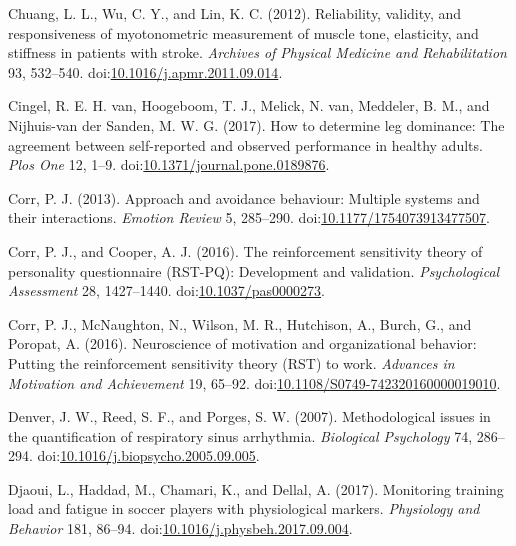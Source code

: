 \documentclass[
]{frontiersHLTH}
\newlength{\cslhangindent}
\newenvironment{cslreferences}%
  {\setlength{\parindent}{0pt}%
  \everypar{\setlength{\hangindent}{\cslhangindent}}\ignorespaces}%
  {\par}
\begin{document}
\begin{cslreferences}
\leavevmode\hypertarget{ref-Chuang2012}{}%
Chuang, L. L., Wu, C. Y., and Lin, K. C. (2012). Reliability, validity,
and responsiveness of myotonometric measurement of muscle tone,
elasticity, and stiffness in patients with stroke. \emph{Archives of
Physical Medicine and Rehabilitation} 93, 532--540.
doi:\href{https://doi.org/10.1016/j.apmr.2011.09.014}{10.1016/j.apmr.2011.09.014}.

\leavevmode\hypertarget{ref-VanCingel2017}{}%
Cingel, R. E. H. van, Hoogeboom, T. J., Melick, N. van, Meddeler, B. M.,
and Nijhuis-van der Sanden, M. W. G. (2017). How to determine leg
dominance: The agreement between self-reported and observed performance
in healthy adults. \emph{Plos One} 12, 1--9.
doi:\href{https://doi.org/10.1371/journal.pone.0189876}{10.1371/journal.pone.0189876}.

\leavevmode\hypertarget{ref-Corr2013}{}%
Corr, P. J. (2013). Approach and avoidance behaviour: Multiple systems
and their interactions. \emph{Emotion Review} 5, 285--290.
doi:\href{https://doi.org/10.1177/1754073913477507}{10.1177/1754073913477507}.

\leavevmode\hypertarget{ref-Corr2016c}{}%
Corr, P. J., and Cooper, A. J. (2016). The reinforcement sensitivity
theory of personality questionnaire (RST-PQ): Development and
validation. \emph{Psychological Assessment} 28, 1427--1440.
doi:\href{https://doi.org/10.1037/pas0000273}{10.1037/pas0000273}.

\leavevmode\hypertarget{ref-Corr2016b}{}%
Corr, P. J., McNaughton, N., Wilson, M. R., Hutchison, A., Burch, G.,
and Poropat, A. (2016). Neuroscience of motivation and organizational
behavior: Putting the reinforcement sensitivity theory (RST) to work.
\emph{Advances in Motivation and Achievement} 19, 65--92.
doi:\href{https://doi.org/10.1108/S0749-742320160000019010}{10.1108/S0749-742320160000019010}.

\leavevmode\hypertarget{ref-Denver2007}{}%
Denver, J. W., Reed, S. F., and Porges, S. W. (2007). Methodological
issues in the quantification of respiratory sinus arrhythmia.
\emph{Biological Psychology} 74, 286--294.
doi:\href{https://doi.org/10.1016/j.biopsycho.2005.09.005}{10.1016/j.biopsycho.2005.09.005}.

\leavevmode\hypertarget{ref-Djaoui2017}{}%
Djaoui, L., Haddad, M., Chamari, K., and Dellal, A. (2017). Monitoring
training load and fatigue in soccer players with physiological markers.
\emph{Physiology and Behavior} 181, 86--94.
doi:\href{https://doi.org/10.1016/j.physbeh.2017.09.004}{10.1016/j.physbeh.2017.09.004}.


\end{cslreferences}
\end{document}
